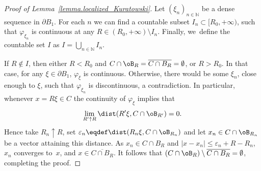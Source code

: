 \begin{proof}[Proof of Lemma~\ref{lemma.localized_Kuratowski}]
Let $(\xi_n)_{n \in \mathbb{N}}$ be a dense sequence in $\partial B_1$.
For each $n$ we can find a countable subset $I_n\subset [R_0,+\infty)$, such that $\varphi_{\xi_n}$
is continuous at any $R\in (R_0,+\infty)\setminus I_n$.
Finally, we~define the countable set $I$ as
$
I= \bigcup_{n\in \mathbb{N}} I_n.
$

If $R\not\in I$, then either $R<R_0$ and
$C\cap\oB_R=\overline{C\cap B_R}=\emptyset$, or
$R>R_0$. In that case, for any $\xi\in\partial B_1$,
$\varphi_\xi$ is continuous. Otherwise, there would be some $\xi_n$,
close enough to $\xi$, such that $\varphi_{\xi_n}$ is discontinuous,
a contradiction. In particular, whenever $x = R\xi \in C$ the continuity of $\varphi_\xi$ implies that
\[
\lim_{R'\uparrow R}\dist(R'\xi,C\cap \oB_{R'})=0.
\]
Hence take $R_n \uparrow R$, set $\varepsilon_n \eqdef \dist(R_n\xi,C\cap \oB_{R_n})$ and let $x_n \in C\cap \oB_{R_n}$ be a vector attaining this distance. As $x_n \in C \cap B_R$ and $|x - x_n| \le \varepsilon_n + R - R_n$, $x_n$ converges to~$x$, and $x\in \overline{C\cap B_R}$. It follows that $(C\cap\oB_R)\setminus
\overline{C\cap B_R}=\emptyset$, completing the proof.
\end{proof}

